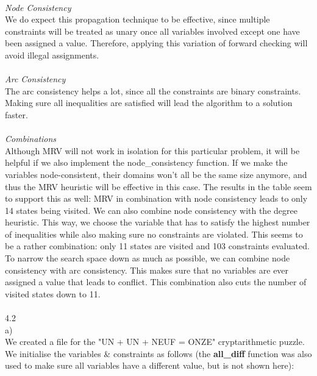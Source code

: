 \documentclass{article}
\begin{document}
\\
\textit{Node Consistency}\\
We do expect this propagation technique to be effective, since multiple constraints will be treated as unary once all variables involved except one have been assigned a value. Therefore, applying this variation of forward checking will avoid illegal assignments. \\
\\
\textit{Arc Consistency}\\
The arc consistency helps a lot, since all the constraints are binary constraints. Making sure all inequalities are satisfied will lead the algorithm to a solution faster. \\
\\
\textit{Combinations}\\
Although MRV will not work in isolation for this particular problem, it will be helpful if we also implement the node\_consistency function. If we make the variables node-consistent, their domains won't all be the same size anymore, and thus the MRV heuristic will be effective in this case. The results in the table seem to support this as well: MRV in combination with node consistency leads to only 14 states being visited. We can also combine node consistency with the degree heuristic. This way, we choose the variable that has to satisfy the highest number of inequalities while also making sure no constraints are violated. This seems to be a rather combination: only 11 states are visited and 103 constraints evaluated. To narrow the search space down as much as possible, we can combine node consistency with arc consistency. This makes sure that no variables are ever assigned a value that leads to conflict. This combination also cuts the number of visited states down to 11. \\
\\
4.2
\\
a)
\\
We created a file for the "UN + UN + NEUF = ONZE" cryptarithmetic puzzle. We initialise the variables \& constraints as follows (the \textbf{all\_diff} function was also used to make sure all variables have a different value, but is not shown here):
\end{document}
